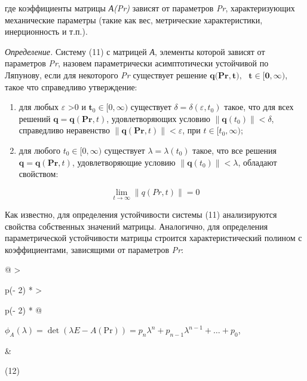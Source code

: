 где коэффициенты матрицы \emph{А(Pr)} зависят от параметров \emph{Pr},
характеризующих механические параметры (такие как вес, метрические
характеристики, инерционность и т.п.).

\emph{Определение.} Систему (11) с матрицей \emph{А}, элементы которой
зависят от параметров \emph{Pr}, назовем параметрически асимптотически
устойчивой по Ляпунову, если для некоторого \emph{Pr} существует решение
\(\mathbf{q(}\mathbf{Pr,}\mathbf{t}\mathbf{),}\text{     }\mathbf{t}\mathbf{\in}\mathbf{\lbrack 0,}\mathbf{\infty}\mathbf{)}\),
такое что справедливо утверждение:
\begin{enumerate}
  \def\labelenumi{\arabic{enumi})}
  \item
    для любых \(\varepsilon\) \textgreater 0 и
    \(\mathbf{t}_{0} \in [0, \infty)\)
    существует
    \(\delta = \delta(\varepsilon, t_{0})\)
    такое, что для всех решений
    \(\mathbf{q} = \mathbf{q}(\mathbf{Pr}, t)\), удовлетворяющих
    условию
    \(\left\| \mathbf{q}(t_{0}) \right\| < \delta\),
    справедливо неравенство
    \(\left\| \mathbf{q}(\mathbf{Pr}, t) \right\| < \varepsilon\),
    при
    \(t \in [t_{0}, \infty)\);
  \item
    для любого
    \(t_{0} \in [0, \infty)\)
    существует
    \(\lambda = \lambda(t_{0})\)
    такое, что все решения
    \(\mathbf{q} = \mathbf{q}(\mathbf{Pr}, t)\), удовлетворяющие
    условию
    \(\left\| \mathbf{q}(t_{0}) \right\| < \lambda\),
    обладают свойством:
  \end{enumerate}
  
\begin{equation*}
  \lim_{t \to \infty} \|q(Pr,t)\| = 0
\end{equation*}
    

Как известно, для определения устойчивости системы (11) анализируются
свойства собственных значений матрицы. Аналогично, для определения
параметрической устойчивости матрицы строится характеристический полином
с коэффициентами, зависящими от параметров \emph{Pr}:
\begin{longtable}[]{@{}
  >{\raggedright\arraybackslash}p{(\columnwidth - 2\tabcolsep) * }
  >{\raggedright\arraybackslash}p{(\columnwidth - 2\tabcolsep) * }@{}}
\begin{minipage}[b]{\linewidth}\raggedright
\(\phi_{A}(\lambda) = \det(\lambda E - A(\text{Pr})) = p_n \lambda^n + p_{n-1} \lambda^{n-1} + \dots + p_0\),
\end{minipage} & \begin{minipage}[b]{\linewidth}\raggedright
(12)
\end{minipage} \\
\end{longtable}



